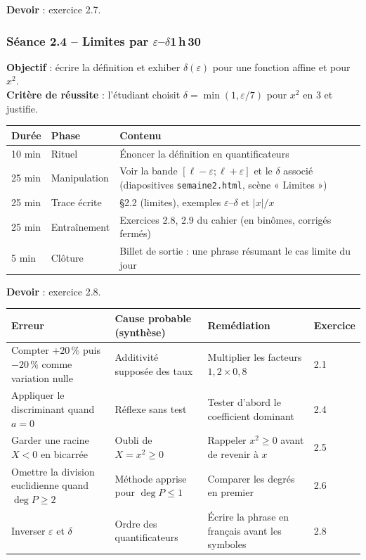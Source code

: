 \documentclass[10.5pt,a4paper]{article}
\newif\ifprof
\newcommand{\synth}{\textsf{\textcolor{ardoise}{(synthèse)}}}
\newcommand{\profonly}[1]{\ifprof #1\fi}
\begin{document}
\textbf{Devoir} : exercice 2.7.\profonly{ \textbf{Point de vigilance} : Exiger le contrôle numérique à chaque décomposition.}\par
{}\subsubsection*{\textcolor{marine}{Séance 2.4 -- Limites par $\varepsilon$--$\delta$}\hfill\normalfont\small\textcolor{ardoise}{1\,h\,30}}
\begin{objectif}\textbf{Objectif} : écrire la définition et exhiber $\delta(\varepsilon)$ pour une fonction affine et pour $x^2$.\\\textbf{Critère de réussite} : l'étudiant choisit $\delta=\min(1,\varepsilon/7)$ pour $x^2$ en $3$ et justifie.\end{objectif}\nopagebreak
\begin{longtable}{@{}p{1.1cm}p{2.4cm}p{12.4cm}@{}}
\toprule \textbf{Durée} & \textbf{Phase} & \textbf{Contenu}\\ \midrule\endhead
10 min & Rituel & Énoncer la définition en quantificateurs\\
25 min & Manipulation & Voir la bande $[\ell-\varepsilon;\ell+\varepsilon]$ et le $\delta$ associé (diapositives \texttt{semaine2.html}, scène « Limites »)\\
25 min & Trace écrite & \S2.2 (limites), exemples $\varepsilon$--$\delta$ et $|x|/x$\\
25 min & Entraînement & Exercices 2.8, 2.9 du cahier (en binômes, corrigés fermés)\\
5 min & Clôture & Billet de sortie : une phrase résumant le cas limite du jour\\ \bottomrule\end{longtable}\nopagebreak
\textbf{Devoir} : exercice 2.8.\profonly{ \textbf{Point de vigilance} : Séance exigeante : prévoir un étayage par étapes (majorer $|x+3|$ d'abord).}\par
\ifprof
\begin{longtable}{@{}p{4.8cm}p{3.6cm}p{4.9cm}p{1.6cm}@{}}
\toprule \textbf{Erreur} & \textbf{Cause probable \synth} & \textbf{Remédiation} & \textbf{Exercice}\\ \midrule\endhead
Compter $+20\,\%$ puis $-20\,\%$ comme variation nulle & Additivité supposée des taux & Multiplier les facteurs $1{,}2\times0{,}8$ & 2.1\\
Appliquer le discriminant quand $a=0$ & Réflexe sans test & Tester d'abord le coefficient dominant & 2.4\\
Garder une racine $X<0$ en bicarrée & Oubli de $X=x^2\ge0$ & Rappeler $x^2\ge0$ avant de revenir à $x$ & 2.5\\
Omettre la division euclidienne quand $\deg P\ge2$ & Méthode apprise pour $\deg P\le1$ & Comparer les degrés en premier & 2.6\\
Inverser $\varepsilon$ et $\delta$ & Ordre des quantificateurs & Écrire la phrase en français avant les symboles & 2.8\\
\bottomrule\end{longtable}
\end{document}
